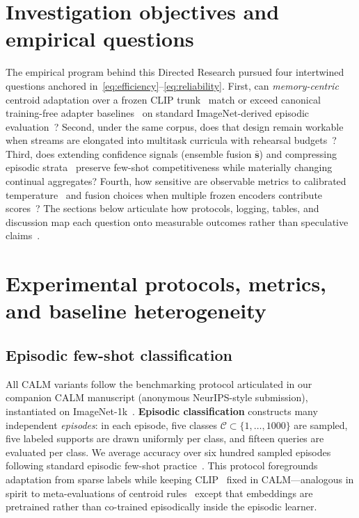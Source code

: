 \documentclass[12pt,a4paper]{report}
\begin{document}
\section{Investigation objectives and empirical questions}
The empirical program behind this Directed Research pursued four intertwined questions anchored in~\eqref{eq:efficiency}--\eqref{eq:reliability}. First, can \emph{memory-centric} centroid adaptation over a frozen CLIP trunk~\cite{r1} match or exceed canonical training-free adapter baselines~\cite{r4} on standard ImageNet-derived episodic evaluation~\cite{r2,r3}? Second, under the same corpus, does that design remain workable when streams are elongated into multitask curricula with rehearsal budgets~\cite{r7,r9,r19}? Third, does extending confidence signals (ensemble fusion $\bar{\mathbf{s}}$) and compressing episodic strata~\cite{r31,r32} preserve few-shot competitiveness while materially changing continual aggregates? Fourth, how sensitive are observable metrics to calibrated temperature~\cite{r5} and fusion choices when multiple frozen encoders contribute scores~\cite{r21}? The sections below articulate how protocols, logging, tables, and discussion map each question onto measurable outcomes rather than speculative claims~\cite{r19}.

\section{Experimental protocols, metrics, and baseline heterogeneity}

\subsection*{Episodic few-shot classification}
All CALM variants follow the benchmarking protocol articulated in our companion CALM manuscript (anonymous NeurIPS-style submission), instantiated on ImageNet-1k~\cite{r2}. \textbf{Episodic classification} constructs many independent \emph{episodes}: in each episode, five classes $\mathcal{C}\subset \{1,\ldots,1000\}$ are sampled, five labeled supports are drawn uniformly per class, and fifteen queries are evaluated per class. We average accuracy over six hundred sampled episodes following standard episodic few-shot practice~\cite{r3}. This protocol foregrounds adaptation from sparse labels while keeping CLIP~\cite{r1} fixed in CALM---analogous in spirit to meta-evaluations of centroid rules~\cite{r3} except that embeddings are pretrained rather than co-trained episodically inside the episodic learner.
\end{document}
